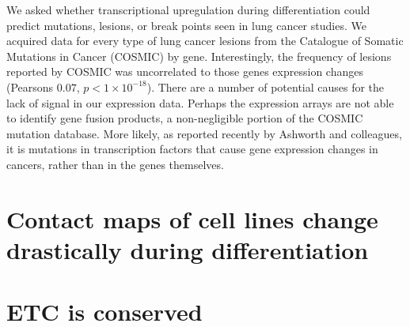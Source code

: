 We asked whether transcriptional upregulation during differentiation could predict mutations, lesions, or break points seen in lung
cancer studies.  We acquired data for every type of lung cancer lesions from the Catalogue of Somatic Mutations in Cancer
(COSMIC)\cite{forbes2009} by gene.  Interestingly, the frequency of lesions reported by COSMIC was uncorrelated to those genes
expression changes (Pearsons $0.07$, $p < 1 \times 10^{-18}$).  There are a number of potential causes for the lack of signal in
our expression data.  Perhaps the expression arrays are not able to identify gene fusion products, a non-negligible portion of
the COSMIC mutation database.  More likely, as reported recently by Ashworth and colleagues, it is mutations in transcription factors
that cause gene expression changes in cancers, rather than in the genes themselves\cite{ashworth2014}.

\section*{Contact maps of cell lines change drastically during differentiation}

\section*{ETC is conserved}
